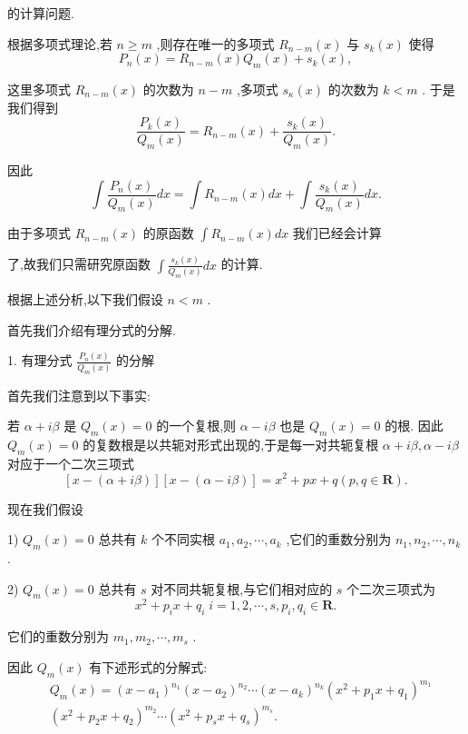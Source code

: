 的计算问题.

根据多项式理论,若 $n \geq  m$ ,则存在唯一的多项式 ${R}_{n - m}\left( x\right)$ 与 ${s}_{k}\left( x\right)$ 使得
$${P}_{n}\left( x\right)  = {R}_{n - m}\left( x\right) {Q}_{m}\left( x\right)  + {s}_{k}\left( x\right) ,$$

这里多项式 ${R}_{n - m}\left( x\right)$ 的次数为 $n - m$ ,多项式 ${s}_{\kappa }\left( x\right)$ 的次数为 $k < m$ . 于是我们得到
$$\frac{{P}_{k}\left( x\right) }{{Q}_{m}\left( x\right) } = {R}_{n - m}\left( x\right)  + \frac{{s}_{k}\left( x\right) }{{Q}_{m}\left( x\right) }.$$

因此
$$\int \frac{{P}_{n}\left( x\right) }{{Q}_{m}\left( x\right) }{dx} = \int {R}_{n - m}\left( x\right) {dx} + \int \frac{{s}_{k}\left( x\right) }{{Q}_{m}\left( x\right) }{dx}.$$

由于多项式 ${R}_{n - m}\left( x\right)$ 的原函数 $\int {R}_{n - m}\left( x\right) {dx}$ 我们已经会计算

了,故我们只需研究原函数 $\int \frac{{s}_{k}\left( x\right) }{{Q}_{m}\left( x\right) }{dx}$ 的计算.

根据上述分析,以下我们假设 $n < m$ .

首先我们介绍有理分式的分解.

1. 有理分式 $\frac{{P}_{n}\left( x\right) }{{Q}_{m}\left( x\right) }$ 的分解

首先我们注意到以下事实:

若 $\alpha  + {i\beta }$ 是 ${Q}_{m}\left( x\right)  = 0$ 的一个复根,则 $\alpha  - {i\beta }$ 也是 ${Q}_{m}\left( x\right)  = 0$ 的根. 因此 ${Q}_{m}\left( x\right)  = 0$ 的复数根是以共轭对形式出现的,于是每一对共轭复根 $\alpha  + {i\beta },\alpha  - {i\beta }$ 对应于一个二次三项式
$$\left\lbrack  {x - \left( {\alpha  + {i\beta }}\right) }\right\rbrack  \left\lbrack  {x - \left( {\alpha  - {i\beta }}\right) }\right\rbrack   = {x}^{2} + {px} + q\left( {p,q \in  \mathbf{R}}\right) .$$

现在我们假设

1) ${Q}_{m}\left( x\right)  = 0$ 总共有 $k$ 个不同实根 ${a}_{1},{a}_{2},\cdots ,{a}_{k}$ ,它们的重数分别为 ${n}_{1},{n}_{2},\cdots ,{n}_{k}$ .

2) ${Q}_{m}\left( x\right)  = 0$ 总共有 $s$ 对不同共轭复根,与它们相对应的 $s$ 个二次三项式为
$${x}^{2} + {p}_{i}x + {q}_{i}\;i = 1,2,\cdots ,s,{p}_{i},{q}_{i} \in  \mathbf{R}.$$

它们的重数分别为 ${m}_{1},{m}_{2},\cdots ,{m}_{s}$ .

因此 ${Q}_{m}\left( x\right)$ 有下述形式的分解式:
\begin{align*}
	&{Q}_{m}\left( x\right)  = {\left( x - {a}_{1}\right) }^{{n}_{1}}{\left( x - {a}_{2}\right) }^{{n}_{2}}\cdots {\left( x - {a}_{k}\right) }^{{n}_{k}}{\left( {x}^{2} + {p}_{1}x + {q}_{1}\right) }^{{m}_{1}}\\
	&{\left( {x}^{2} + {p}_{2}x + {q}_{2}\right) }^{{m}_{2}}\cdots {\left( {x}^{2} + {p}_{s}x + {q}_{s}\right) }^{{m}_{s}}.
\end{align*}

